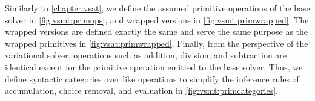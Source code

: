 Similarly to \autoref{chapter:vsat}, we define the assumed primitive operations
of the base solver in \autoref{fig:vsmt:primops}, and wrapped versions in
\autoref{fig:vsmt:primwrapped}. The wrapped versions are defined exactly the
same and serve the same purpose as the wrapped primitives in
\autoref{fig:vsat:primwrapped}. Finally, from the perspective of the variational
solver, operations such as addition, division, and subtraction are identical
except for the primitive operation emitted to the base solver. Thus, we define
syntactic categories over like operations to simplify the inference rules of
accumulation, choice removal, and evaluation in
\autoref{fig:vsmt:primcategories}.

